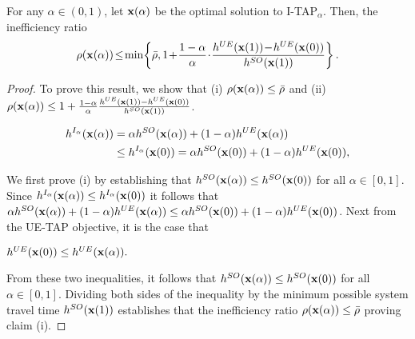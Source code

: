 \documentclass{article}
\newif\ifarxiv   %
\begin{document}
\begin{theorem}  \label{thm:eff-upper-bound}
For any $\alpha \in (0, 1)$, let $\mathbf{x}(\alpha)$ be the optimal solution to I-TAP$_{\alpha}$. Then, the inefficiency ratio
\[\rho(\x(\alpha))\!\leq\!\min\!\left\{ \Bar{\rho},1\!+\! \frac{1-\alpha}{\alpha}\!\cdot\! \frac{\objue(\x(1))\!-\!\objue(\x(0))}{\objso(\x(1))} \right\}.\]
\end{theorem}

\begin{proof}
To prove this result, we show that (i) $\rho(\mathbf{x}(\alpha)) \leq \Bar{\rho}$ and (ii) $\rho(\mathbf{x}(\alpha)) \leq 1+ \frac{1-\alpha}{\alpha} \frac{h^{UE}(\mathbf{x}(1)) - h^{UE}(\mathbf{x}(0))}{h^{SO}(\mathbf{x}(1))}$.

\ifarxiv
We first prove (i) by establishing that $\objso(\x(\alpha)) \leq \objso(\x(0))$ for all $\alpha \in [0, 1]$. Since $\mathbf{x}(\alpha)$ is the optimal solution to I-TAP$_{\alpha}$
\ifarxiv
\begin{align*}
    \objitap(\x(\alpha)) & = \alpha\objso(\x(\alpha)) + (1-\alpha)\objue(\x(\alpha))\\
    & \leq \objitap(\x(0)) \\
    & =  \alpha\objso(\x(0)) + (1-\alpha)\objue(\x(0)).
\end{align*}
\else
\begin{align*}
    h^{I_{\alpha}}(\mathbf{x}(\alpha)) & = \alpha h^{SO}(\mathbf{x}(\alpha)) + (1-\alpha)h^{UE}(\mathbf{x}(\alpha))\\
    & \leq h^{I_{\alpha}}(\mathbf{x}(0)) =  \alpha h^{SO}(\mathbf{x}(0)) + (1-\alpha)h^{UE}(\mathbf{x}(0)),
\end{align*}
\fi
\else
We first prove (i) by establishing that $\objso(\x(\alpha)) \leq \objso(\x(0))$ for all $\alpha \in [0, 1]$. Since $h^{I_{\alpha}}(\mathbf{x}(\alpha)) \leq h^{I_{\alpha}}(\mathbf{x}(0))$ it follows that $\alpha h^{SO}(\mathbf{x}(\alpha)) + (1-\alpha)h^{UE}(\mathbf{x}(\alpha)) \leq  \alpha h^{SO}(\mathbf{x}(0)) + (1-\alpha)h^{UE}(\mathbf{x}(0))$.
\fi
Next from the UE-TAP objective, it is the case that 
\ifarxiv
\[\objue(\x(0))\leq \objue(\x(\alpha)).\] 
\else
$h^{UE}(\mathbf{x}(0))\leq h^{UE}(\mathbf{x}(\alpha)).$
\fi
From these two inequalities, it follows that $h^{SO}(\mathbf{x}(\alpha)) \leq h^{SO}(\mathbf{x}(0))$ for all $\alpha \in [0, 1]$. Dividing both sides of the inequality by the minimum possible system travel time $h^{SO}(\mathbf{x}(1))$ establishes that the inefficiency ratio $\rho(\mathbf{x}(\alpha)) \leq \Bar{\rho}$ proving claim (i).


\end{proof}
\end{document}

